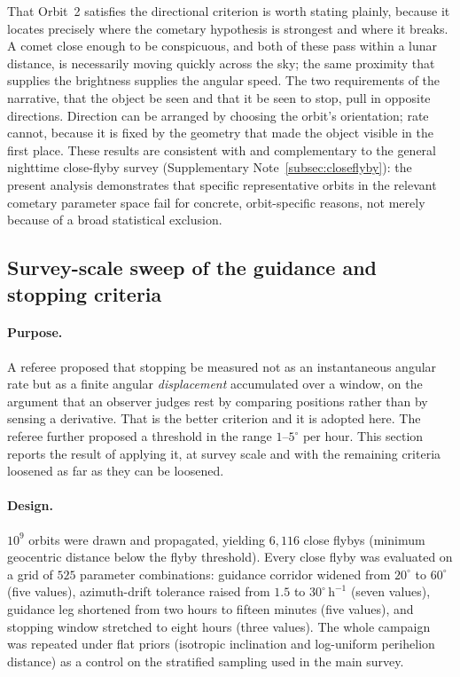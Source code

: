 \documentclass[11pt,a4paper]{article}
\begin{document}
That Orbit~2 satisfies the directional criterion is worth stating plainly,
because it locates precisely where the cometary hypothesis is strongest and
where it breaks.  A comet close enough to be conspicuous, and both of these
pass within a lunar distance, is necessarily moving quickly across the sky;
the same proximity that supplies the brightness supplies the angular speed.
The two requirements of the narrative, that the object be seen and that it
be seen to stop, pull in opposite directions.  Direction can be arranged by
choosing the orbit's orientation; rate cannot, because it is fixed by the
geometry that made the object visible in the first place.
These results are consistent with and complementary to the general
nighttime close-flyby survey (Supplementary Note~\ref{subsec:closeflyby}):
the present analysis demonstrates that specific representative orbits in
the relevant cometary parameter space fail for concrete, orbit-specific
reasons, not merely because of a broad statistical exclusion.

\subsection{Survey-scale sweep of the guidance and stopping criteria}
\label{subsec:sweep}

\paragraph{Purpose.}
A referee proposed that stopping be measured not as an instantaneous angular
rate but as a finite angular \emph{displacement} accumulated over a window, on
the argument that an observer judges rest by comparing positions rather than by
sensing a derivative. That is the better criterion and it is adopted here. The
referee further proposed a threshold in the range $1$--$5^\circ$ per hour. This
section reports the result of applying it, at survey scale and with the
remaining criteria loosened as far as they can be loosened.

\paragraph{Design.}
$10^{9}$ orbits were drawn and propagated, yielding $6{,}116$ close flybys
(minimum geocentric distance below the flyby threshold). Every close flyby was
evaluated on a grid of $525$ parameter combinations: guidance corridor widened
from $20^\circ$ to $60^\circ$ (five values), azimuth-drift tolerance raised from
$1.5$ to $30^\circ\,\mathrm{h}^{-1}$ (seven values), guidance leg shortened from
two hours to fifteen minutes (five values), and stopping window stretched to
eight hours (three values). The whole campaign was repeated under flat priors
(isotropic inclination and log-uniform perihelion distance) as a control on
the stratified sampling used in the main survey.
\end{document}
